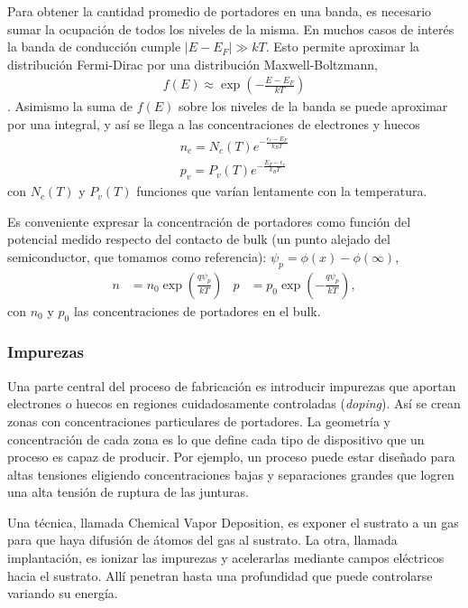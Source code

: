Para obtener la cantidad promedio de portadores en una banda,
es necesario sumar la ocupación de todos los niveles de la misma. 
En muchos casos de interés la banda de conducción cumple 
$|E-E_F| \gg kT$.
Esto permite aproximar la distribución Fermi-Dirac 
por una distribución Maxwell-Boltzmann,
\begin{align*}
    f(E) \approx \exp\left(-\frac{E-E_F}{kT}\right)
\end{align*}.
Asimismo la suma de $f(E)$ sobre los niveles de la banda se puede aproximar
por una integral, y así se llega a las concentraciones de electrones y huecos
\begin{align*}
    n_c = N_c(T)e^{-\frac{\epsilon_c-E_F}{k_BT}}\\
    p_v = P_v(T)e^{-\frac{E_F-\epsilon_v}{k_BT}}
\end{align*} con $N_c(T)$ y $P_v(T)$ funciones que varían lentamente con la
temperatura.

Es conveniente expresar la concentración de portadores 
como función del potencial medido respecto del contacto de bulk
(un punto alejado del semiconductor, que tomamos como referencia):
$\psi_p=\phi(x)-\phi(\infty)$,
\begin{align}
    n &= n_0\exp\left(\frac{q\psi_p}{kT}\right)&
    p &= p_0\exp\left(-\frac{q\psi_p}{kT}\right),
    \label{eq:portadores_nodegenerados}
\end{align}
con $n_0$ y $p_0$ las concentraciones de portadores en el bulk.
\subsubsection{Impurezas}
Una parte central del proceso de fabricación
es introducir impurezas que aportan electrones o huecos
en regiones cuidadosamente controladas (\emph{doping}).
Así se crean zonas con concentraciones particulares de portadores.
La geometría y concentración de cada zona
es lo que define cada tipo de dispositivo 
que un proceso es capaz de producir.
Por ejemplo, un proceso puede estar diseñado para altas tensiones
eligiendo concentraciones bajas y separaciones grandes
que logren una alta tensión de ruptura de las junturas.

Una técnica, llamada Chemical Vapor Deposition,
es exponer el sustrato a un gas
para que haya difusión de átomos del gas al sustrato.
La otra, llamada implantación, es ionizar las impurezas 
y acelerarlas mediante campos eléctricos hacia el sustrato.
Allí penetran hasta una profundidad que puede controlarse 
variando su energía\cite{campbell_science_2001}.


